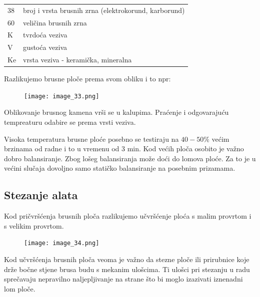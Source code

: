 \documentclass[a4paper,12pt]{article}
\numberwithin{figure}{section}
\begin{document}
\begin{table}[!h]
\centering
\begin{tabular}{ll}
38 & broj i vrsta brusnih zrna (elektrokorund, karborund) \\
60 & veličina brusnih zrna                                \\
K  & tvrdoća veziva                                       \\
V  & gustoća veziva                                       \\
Ke & vrsta veziva - keramička, mineralna                 
\end{tabular}
\end{table}
\FloatBarrier
Razlikujemo brusne ploče prema svom obliku i to npr:
\begin{figure}[!h]
\centering
\texttt{[image: image\_33.png]}
\end{figure}
\FloatBarrier
Oblikovanje brusnog kamena vrši se u kalupima. Praćenje i odgovarajuću tempreaturu odabire se prema vrsti veziva.\par
Visoka temperatura brusne ploće posebno se testiraju na $40 - 50\%$ većim brzinama od radne i to u vremenu od 3 min. Kod većih ploča osobito je važno dobro balansiranje. Zbog lošeg balansiranja može doći do lomova ploće. Za to je u većini slučaja dovoljno samo statičko balansiranje na posebnim prizamama.
\subsection{Stezanje alata}
Kod pričvršćenja brusnih ploča razlikujemo učvršćenje ploća s malim provrtom i s velikim provrtom.
\begin{figure}[!h]
\centering
\texttt{[image: image\_34.png]}
\end{figure}
\FloatBarrier
Kod učvršćenja brusnih ploča veoma je važno da stezne ploče ili prirubnice koje drže bočne stjene brusa budu s mekanim ulošcima. Ti ulošci pri stezanju u radu sprečavaju nepravilno naljepljivanje na strane što bi moglo izazivati iznenadni lom ploče.
\end{document}
